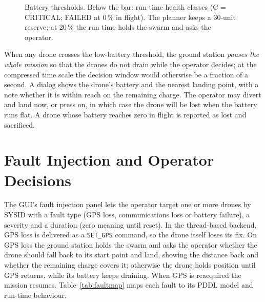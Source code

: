 \documentclass[11pt,a4paper,oneside]{report}
\newcommand{\code}[1]{\texttt{#1}}
\begin{document}
\begin{figure}[H]
\centering
{}
\caption{Battery thresholds. Below the bar: run-time health classes (C = CRITICAL; FAILED at
0\,\% in flight). The planner keeps a 30-unit reserve; at 20\,\% the run time holds the swarm
and asks the operator.}
\label{fig:battery}
\end{figure}

\noindent When any drone crosses the low-battery threshold, the ground station \emph{pauses the
whole mission} so that the drones do not drain while the operator decides; at the compressed time
scale the decision window would otherwise be a fraction of a second. A dialog shows the drone's
battery and the nearest landing point, with a note whether it is within reach on the remaining
charge. The operator may divert and land now, or press on, in which case the drone will be lost
when the battery runs flat. A drone whose battery reaches zero in flight is reported as lost and
sacrificed.

\section{Fault Injection and Operator Decisions}
The GUI's fault injection panel lets the operator target one or more drones by SYSID with a
fault type (GPS loss, communications loss or battery failure), a severity and a duration
(zero meaning until reset). In the thread-based backend, GPS loss is delivered as a
\code{SET\_GPS} command, so the drone itself loses its fix. On GPS loss the ground station holds
the swarm and asks the operator whether the drone should fall back to its start point and land,
showing the distance back and whether the remaining charge covers it; otherwise the drone holds
position until GPS returns, while its battery keeps draining. When GPS is reacquired the mission
resumes. Table~\ref{tab:faultmap} maps each fault to its PDDL model and run-time behaviour.
\end{document}

